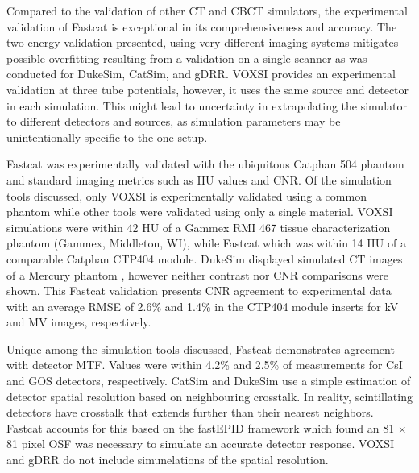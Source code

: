 Compared to the validation of other CT and CBCT simulators, the experimental validation of Fastcat is exceptional in its comprehensiveness and accuracy. The two energy validation presented, using very different imaging systems mitigates possible overfitting resulting from a validation on a single scanner as was conducted for DukeSim, CatSim, and gDRR. VOXSI provides an experimental validation at three tube potentials, however, it uses the same source and detector in each simulation. This might lead to uncertainty in extrapolating the simulator to different detectors and sources, as simulation parameters may be unintentionally specific to the one setup.

Fastcat was experimentally validated with the ubiquitous Catphan 504 phantom and standard imaging metrics such as HU values and CNR. Of the simulation tools discussed, only VOXSI is experimentally validated using a common phantom while other tools were validated using only a single material. VOXSI simulations were within 42 HU of a Gammex RMI 467 tissue characterization phantom (Gammex, Middleton, WI), while Fastcat which was within 14 HU of a comparable Catphan CTP404 module. DukeSim displayed simulated CT images of a Mercury phantom \cite{Wilson2013ASystems}, however neither contrast nor CNR comparisons were shown. This Fastcat validation presents CNR agreement to experimental data with an average RMSE of 2.6\% and 1.4\% in the CTP404 module inserts for kV and MV images, respectively.

Unique among the simulation tools discussed, Fastcat demonstrates agreement with detector MTF. Values were within 4.2\% and 2.5\% of measurements for CsI and GOS detectors, respectively. CatSim and DukeSim use a simple estimation of detector spatial resolution based on neighbouring crosstalk. In reality, scintillating detectors have crosstalk that extends further than their nearest neighbors. Fastcat accounts for this based on the fastEPID framework \cite{Shi2019ADetectors.} which found an 81 $\times$ 81 pixel OSF was necessary to simulate an accurate detector response. VOXSI and gDRR do not include simunelations of the spatial resolution.

